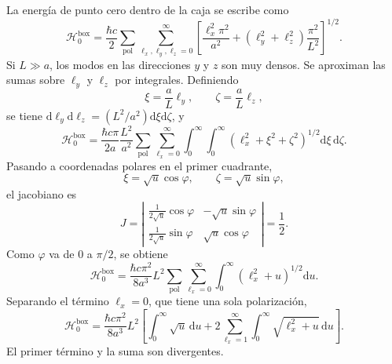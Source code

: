 \documentclass[11pt]{article}
\newcommand{\dd}{\mathrm{d}}
\begin{document}
La energ\'ia de punto cero dentro de la caja se escribe como
\begin{equation}
  \mathcal H_0^{\mathrm{box}}
  =
  \frac{\hbar c}{2}
  \sum_{\mathrm{pol}}
  \sum_{\ell_x,\ell_y,\ell_z=0}^{\infty}
  \left[
  \frac{\ell_x^2\pi^2}{a^2}
  +
  (\ell_y^2+\ell_z^2)\frac{\pi^2}{L^2}
  \right]^{1/2}.
\end{equation}
Si $L\gg a$, los modos en las direcciones $y$ y $z$ son muy densos. Se
aproximan las sumas sobre $\ell_y$ y $\ell_z$ por integrales. Definiendo
\begin{equation}
  \xi=\frac{a}{L}\ell_y,
  \qquad
  \zeta=\frac{a}{L}\ell_z,
\end{equation}
se tiene $\dd \ell_y\dd\ell_z=(L^2/a^2)\dd\xi\dd\zeta$, y
\begin{equation}
  \mathcal H_0^{\mathrm{box}}
  =
  \frac{\hbar c\pi}{2a}
  \frac{L^2}{a^2}
  \sum_{\mathrm{pol}}
  \sum_{\ell_x=0}^{\infty}
  \int_0^\infty\int_0^\infty
  (\ell_x^2+\xi^2+\zeta^2)^{1/2}
  \dd\xi\,\dd\zeta.
\end{equation}
Pasando a coordenadas polares en el primer cuadrante,
\begin{equation}
  \xi=\sqrt{u}\cos\varphi,
  \qquad
  \zeta=\sqrt{u}\sin\varphi,
\end{equation}
el jacobiano es
\begin{equation}
  J
  =
  \left|
  \begin{matrix}
  \frac{1}{2\sqrt u}\cos\varphi & -\sqrt u\sin\varphi\\
  \frac{1}{2\sqrt u}\sin\varphi & \sqrt u\cos\varphi
  \end{matrix}
  \right|
  =
  \frac{1}{2}.
\end{equation}
Como $\varphi$ va de $0$ a $\pi/2$, se obtiene
\begin{equation}
  \mathcal H_0^{\mathrm{box}}
  =
  \frac{\hbar c\pi^2}{8a^3}L^2
  \sum_{\mathrm{pol}}
  \sum_{\ell_x=0}^{\infty}
  \int_0^\infty
  (\ell_x^2+u)^{1/2}\dd u.
\end{equation}
Separando el t\'ermino $\ell_x=0$, que tiene una sola polarizaci\'on,
\begin{equation}
  \mathcal H_0^{\mathrm{box}}
  =
  \frac{\hbar c\pi^2}{8a^3}L^2
  \left[
  \int_0^\infty \sqrt u\,\dd u
  +
  2\sum_{\ell_x=1}^{\infty}
  \int_0^\infty
  \sqrt{\ell_x^2+u}\,\dd u
  \right].
\end{equation}
El primer t\'ermino y la suma son divergentes.
\end{document}
